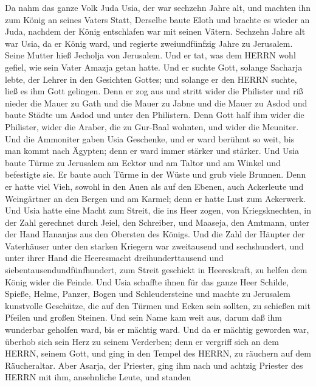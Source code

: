  Da nahm das ganze Volk Juda Usia, der war sechzehn Jahre
alt, und machten ihn zum König an seines Vaters Statt, 
Derselbe baute Eloth und brachte es wieder an Juda, nachdem der König
entschlafen war mit seinen Vätern.  Sechzehn Jahre alt war
Usia, da er König ward, und regierte zweiundfünfzig Jahre zu Jerusalem.
Seine Mutter hieß Jecholja von Jerusalem.  Und er tat, was
dem HERRN wohl gefiel, wie sein Vater Amazja getan hatte. 
Und er suchte Gott, solange Sacharja lebte, der Lehrer in den Gesichten
Gottes; und solange er den HERRN suchte, ließ es ihm Gott gelingen.
 Denn er zog aus und stritt wider die Philister und riß
nieder die Mauer zu Gath und die Mauer zu Jabne und die Mauer zu Asdod
und baute Städte um Asdod und unter den Philistern.  Denn
Gott half ihm wider die Philister, wider die Araber, die zu Gur-Baal
wohnten, und wider die Meuniter.  Und die Ammoniter gaben
Usia Geschenke, und er ward berühmt so weit, bis man kommt nach Ägypten;
denn er ward immer stärker und stärker.  Und Usia baute
Türme zu Jerusalem am Ecktor und am Taltor und am Winkel und befestigte
sie.  Er baute auch Türme in der Wüste und grub viele
Brunnen. Denn er hatte viel Vieh, sowohl in den Auen als auf den Ebenen,
auch Ackerleute und Weingärtner an den Bergen und am Karmel; denn er
hatte Lust zum Ackerwerk.  Und Usia hatte eine Macht zum
Streit, die ins Heer zogen, von Kriegsknechten, in der Zahl gerechnet
durch Jeiel, den Schreiber, und Maaseja, den Amtmann, unter der Hand
Hananjas aus den Obersten des Königs.  Und die Zahl der
Häupter der Vaterhäuser unter den starken Kriegern war zweitausend und
sechshundert,  und unter ihrer Hand die Heeresmacht
dreihunderttausend und siebentausendundfünfhundert, zum Streit geschickt
in Heereskraft, zu helfen dem König wider die Feinde.  Und
Usia schaffte ihnen für das ganze Heer Schilde, Spieße, Helme, Panzer,
Bogen und Schleudersteine  und machte zu Jerusalem
kunstvolle Geschütze, die auf den Türmen und Ecken sein sollten, zu
schießen mit Pfeilen und großen Steinen. Und sein Name kam weit aus,
darum daß ihm wunderbar geholfen ward, bis er mächtig ward.
 Und da er mächtig geworden war, überhob sich sein Herz zu
seinem Verderben; denn er vergriff sich an dem HERRN, seinem Gott, und
ging in den Tempel des HERRN, zu räuchern auf dem Räucheraltar.
 Aber Asarja, der Priester, ging ihm nach und achtzig
Priester des HERRN mit ihm, ansehnliche Leute,  und standen
